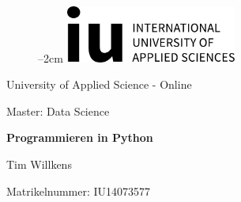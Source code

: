 
\label{titlePage}
\begin{figure}[h]
\centering
\advance\leftskip--2cm
\includegraphics[width=0.50\textwidth]{pics/logo.pdf}
\end{figure}
\FloatBarrier

\begin{Large} 
\begin{center}

\end{center}
\end{Large} 

\vspace*{5mm}

\begin{large} 
\begin{center}
University of Applied Science - Online
\end{center}
\end{large} 

\begin{large} 
\begin{center}
Master: Data Science
\end{center}
\end{large}

\vspace*{15mm}

\begin{Large} 
\begin{center}
\textbf{Programmieren in Python}
\end{center}
\end{Large}

\vspace*{15mm}

\begin{large} 
\begin{center}
	Tim Willkens
\end{center}
\end{large} 

\vspace*{-6mm}

\begin{large} 
\begin{center}
Matrikelnummer: IU14073577
\end{center}
\end{large} 

